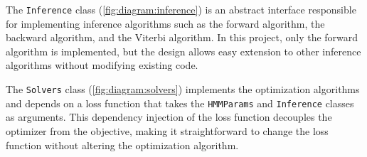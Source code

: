 The \texttt{Inference} class (\ref{fig:diagram:inference}) is an abstract interface responsible for implementing inference algorithms such as the forward algorithm, the backward algorithm, and the Viterbi algorithm.
In this project, only the forward algorithm is implemented, but the design allows easy extension to other inference algorithms without modifying existing code.

The \texttt{Solvers} class (\ref{fig:diagram:solvers}) implements the optimization algorithms and depends on a loss function that takes the \texttt{HMMParams} and \texttt{Inference} classes as arguments.
This dependency injection of the loss function decouples the optimizer from the objective, making it straightforward to change the loss function without altering the optimization algorithm.

